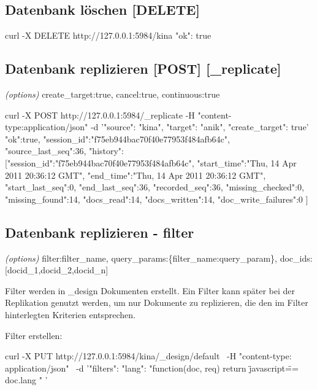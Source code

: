 \documentclass[19pt,landscape,twocolumn]{article}
\newcommand{\htmlverb}[1]{{[}\textbf{{#1}}{]}}
\newcommand{\brackets}[1]{{[}{#1}{]}}
\begin{document}
\subsection{Datenbank löschen \htmlverb{DELETE}}

\begin{code}
curl -X DELETE http://127.0.0.1:5984/kina
{"ok": true}
\end{code}

\subsection{Datenbank replizieren \htmlverb{POST} \htmlverb{\_replicate}}
\emph{(options)} create\_target:true, cancel:true, continuous:true

\begin{code}
curl -X POST http://127.0.0.1:5984/_replicate 
     -H "content-type:application/json" 
     -d '{"source": "kina", 
          "target": "anik",
          "create_target": true}'
{"ok":true, "session_id":"f75eb944bac70f40e77953f484afb64c", 
 "source_last_seq":36, "history":
   [{"session_id":"f75eb944bac70f40e77953f484afb64c",
     "start_time":"Thu, 14 Apr 2011 20:36:12 GMT", 
     "end_time":"Thu, 14 Apr 2011 20:36:12 GMT",
     "start_last_seq":0,
     "end_last_seq":36,
     "recorded_seq":36,
     "missing_checked":0,
     "missing_found":14,
     "docs_read":14,
     "docs_written":14,
     "doc_write_failures":0
  }]
}
\end{code}

\subsection{Datenbank replizieren - filter}
\emph{(options)} filter:filter\_name, query\_params:\{filter\_name:query\_param\},\newline
doc\_ids: \brackets{docid\_1,docid\_2,docid\_n} \newline

Filter werden in \_design Dokumenten erstellt. Ein Filter kann später bei der Replikation genutzt werden, um nur
Dokumente zu replizieren, die den im Filter hinterlegten Kriterien entsprechen.

Filter erstellen:

\begin{code}
curl -X PUT http://127.0.0.1:5984/kina/_design/default \
  -H "content-type: application/json" \
  -d '{"filters":{
        "lang": 
          "function(doc, req) { 
            return \"javascript\" == doc.lang 
          }"
        }
     }'
\end{code}
\end{document}
